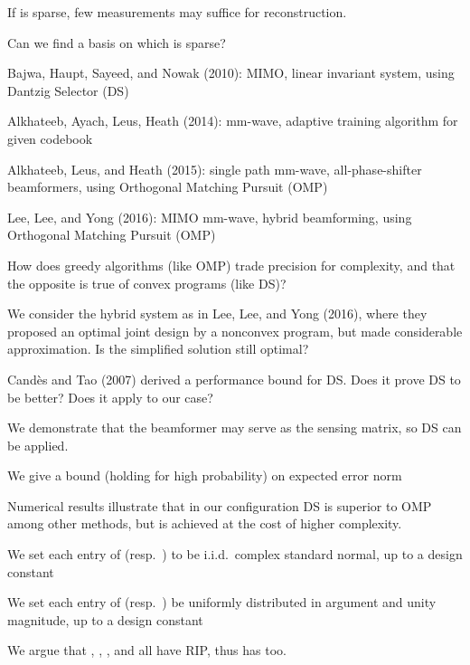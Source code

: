 {
\blank [big]

\I If  is sparse, few measurements may suffice for reconstruction.

\I Can we find a basis on which  is sparse?
}
{
\I Bajwa, Haupt, Sayeed, and Nowak (2010): MIMO, linear invariant system, using Dantzig Selector (DS)

\I Alkhateeb, Ayach, Leus, Heath (2014): mm-wave, adaptive training algorithm for given codebook

\I Alkhateeb, Leus, and Heath (2015): single path mm-wave, all-phase-shifter beamformers, using Orthogonal Matching Pursuit (OMP)

\I Lee, Lee, and Yong (2016): MIMO mm-wave, hybrid beamforming, using Orthogonal Matching Pursuit (OMP)
}
{
\I How does greedy algorithms (like OMP) trade precision for complexity, and that the opposite is true of convex programs (like DS)?

\I We consider the hybrid system as in Lee, Lee, and Yong (2016), where they proposed an optimal joint design by a nonconvex program, but made considerable approximation.
Is the simplified solution still optimal?

\I Candès and Tao (2007) derived a performance bound for DS.
Does it prove DS to be better?
Does it apply to our case?
}
{
\I We demonstrate that the beamformer may serve as the sensing matrix, so DS can be applied.

\I We give a bound (holding for high probability) on expected error norm

\I Numerical results illustrate that in our configuration DS is superior to OMP among other methods, but is achieved at the cost of higher complexity.
}
{
\I We set each entry of  (resp.\ ) to be i.i.d.\ complex standard normal, up to a design constant

\I We set each entry of  (resp.\ ) be uniformly distributed in argument and unity magnitude, up to a design constant

\I We argue that , , , and  all have RIP, thus  has too.
}

